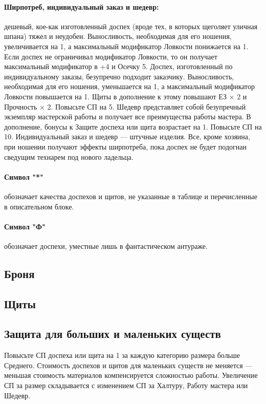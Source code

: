 \paragraph{Ширпотреб, индивидуальный заказ и шедевр:} дешевый, кое-как изготовленный доспех (вроде тех, в которых щеголяет уличная шпана) тяжел и неудобен. Выносливость, необходимая для его ношения, увеличивается на 1, а максимальный модификатор Ловкости понижается на 1. Если доспех не ограничивал модификатор Ловкости, то он получает максимальный модификатор в +4 и Осечку 5.
\newline
Доспех, изготовленный по индивидуальному заказы, безупречно подходит заказчику. Выносливость, необходимая для его ношения, уменьшается на 1, а максимальный модификатор Ловкости повышается на 1. Щиты в дополнение к этому повышают ЕЗ × 2 и Прочность × 2. Повысьте СП на 5.
\newline
Шедевр представляет собой безупречный экземпляр мастерской работы и получает все преимущества работы мастера. В дополнение, бонусы к Защите доспеха или щита возрастает на 1. Повысьте СП на 10.
\newline
Индивидуальный заказ и шедевр — штучные изделия. Все, кроме хозяина, при ношении получают эффекты ширпотреба, пока доспех не будет подогнан сведущим технарем под нового  ладельца.
\paragraph{Символ "*"} обозначает качества доспехов и щитов, не указанные в таблице и перечисленные в описательном блоке.
\paragraph{Символ "Ф"} обозначает доспехи, уместные лишь в фантастическом антураже.
\subsection{Броня}

\subsection{Щиты}


\subsection{Защита для больших и маленьких существ}
Повысьте СП доспеха или щита на 1 за каждую категорию размера больше Среднего. Стоимость доспехов и щитов для маленьких существ не меняется — меньшая стоимость материалов компенсируется сложностью работы. Увеличение СП за размер складывается с изменением СП за Халтуру, Работу мастера или Шедевр.
